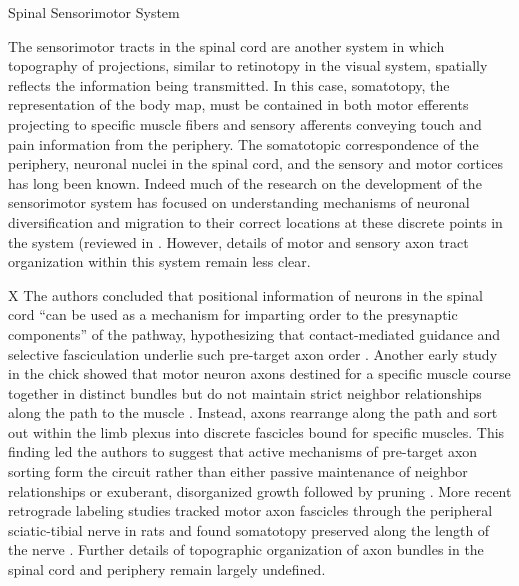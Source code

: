 Spinal Sensorimotor System

The sensorimotor tracts in the spinal cord are another system in which topography of projections, similar to retinotopy in the visual system, spatially reflects the information being transmitted.
In this case, somatotopy, the representation of the body map, must be contained in both motor efferents projecting to specific muscle fibers and sensory afferents conveying touch and pain information from the periphery.
The somatotopic correspondence of the periphery, neuronal nuclei in the spinal cord, and the sensory and motor cortices has long been known.
Indeed much of the research on the development of the sensorimotor system has focused on understanding mechanisms of neuronal diversification and migration to their correct locations at these discrete points in the system (reviewed in \cite{kania2014spinal}.
However, details of motor and sensory axon tract organization within this system remain less clear.

X
The authors concluded that positional information of neurons in the spinal cord “can be used as a mechanism for imparting order to the presynaptic components” of the pathway, hypothesizing that contact-mediated guidance and selective fasciculation underlie such pre-target axon order \cite{nornes1980pattern}. 
Another early study in the chick showed that motor neuron axons destined for a specific muscle course together in distinct bundles but do not maintain strict neighbor relationships along the path to the muscle \cite{lance1981pathway}. 
Instead, axons rearrange along the path and sort out within the limb plexus into discrete fascicles bound for specific muscles. 
This finding led the authors to suggest that active mechanisms of pre-target axon sorting form the circuit rather than either passive maintenance of neighbor relationships or exuberant, disorganized growth followed by pruning \cite{lance1981pathway}. 
More recent retrograde labeling studies tracked motor axon fascicles through the peripheral sciatic-tibial nerve in rats and found somatotopy preserved along the length of the nerve \cite{badia2010topographical}. 
Further details of topographic organization of axon bundles in the spinal cord and periphery remain largely undefined.

